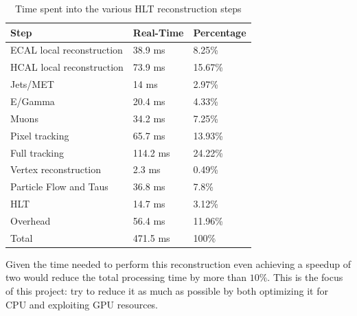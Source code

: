 \begin{table}[ht]
  \caption{Time spent into the various HLT reconstruction steps}
  \label{table:timeshare}
  \begin{tabular}{lll}
    \hline
    Step                      & Real-Time      & Percentage \\ \hline
    ECAL local reconstruction & 38.9 ms        & 8.25\%     \\
    HCAL local reconstruction & 73.9 ms        & 15.67\%    \\
    Jets/MET                  & 14 ms          & 2.97\%     \\
    E/Gamma                   & 20.4 ms        & 4.33\%     \\
    Muons                     & 34.2 ms        & 7.25\%     \\
    Pixel tracking            & 65.7 ms        & 13.93\%    \\
    Full tracking             & 114.2 ms       & 24.22\%    \\
    Vertex reconstruction     & 2.3 ms         & 0.49\%     \\
    Particle Flow and Taus    & 36.8 ms        & 7.8\%      \\
    HLT                       & 14.7 ms        & 3.12\%     \\
    Overhead                  & 56.4 ms        & 11.96\%    \\
    Total                     & 471.5 ms       & 100\%      \\ \hline
  \end{tabular}
\end{table}
Given the time needed to perform this reconstruction even achieving a speedup of two would reduce the total processing time by more than $10\%$. This is the focus of this project: try to reduce it as much as possible by both optimizing it for CPU and exploiting GPU resources.
